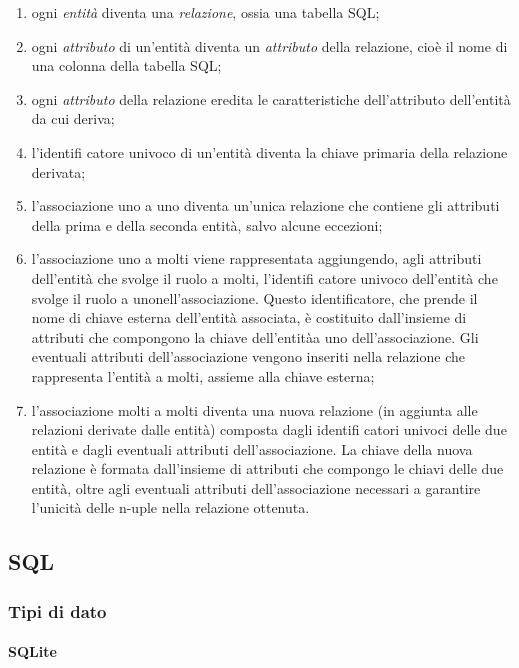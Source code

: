 \documentclass[italian,a4paper]{article}
\providecommand{\tightlist}{%
  \setlength{\itemsep}{0pt}\setlength{\parskip}{0pt}}
\begin{document}
\begin{enumerate}
\def\labelenumi{\arabic{enumi}.}
\tightlist
\item
  ogni \emph{entità} diventa una \emph{relazione}, ossia una tabella
  SQL;
\item
  ogni \emph{attributo} di un'entità diventa un \emph{attributo} della
  relazione, cioè il nome di una colonna della tabella SQL;
\item
  ogni \emph{attributo} della relazione eredita le caratteristiche
  dell'attributo dell'entità da cui deriva;
\item
  l'identifi catore univoco di un'entità diventa la chiave primaria
  della relazione derivata;
\item
  l'associazione uno a uno diventa un'unica relazione che contiene gli
  attributi della prima e della seconda entità, salvo alcune eccezioni;
\item
  l'associazione uno a molti viene rappresentata aggiungendo, agli
  attributi dell'entità che svolge il ruolo a molti, l'identifi catore
  univoco dell'entità che svolge il ruolo a unonell'associazione. Questo
  identificatore, che prende il nome di chiave esterna dell'entità
  associata, è costituito dall'insieme di attributi che compongono la
  chiave dell'entitàa uno dell'associazione. Gli eventuali attributi
  dell'associazione vengono inseriti nella relazione che rappresenta
  l'entità a molti, assieme alla chiave esterna;
\item
  l'associazione molti a molti diventa una nuova relazione (in aggiunta
  alle relazioni derivate dalle entità) composta dagli identifi catori
  univoci delle due entità e dagli eventuali attributi
  dell'associazione. La chiave della nuova relazione è formata
  dall'insieme di attributi che compongo le chiavi delle due entità,
  oltre agli eventuali attributi dell'associazione necessari a garantire
  l'unicità delle n-uple nella relazione ottenuta.
\end{enumerate}

\subsection{SQL}\label{sql}

\subsubsection{Tipi di dato}\label{tipi-di-dato}

\paragraph{SQLite}\label{sqlite}
\end{document}
